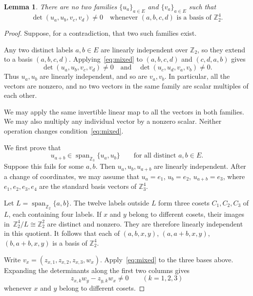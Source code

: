 \documentclass[10pt,a4paper]{amsart}
\theoremstyle{plain}
\newtheorem{lemma}[theorem]{Lemma}
\numberwithin{equation}{section}
\theoremstyle{remark}
\theoremstyle{definition}
\newcommand{\Z}{\mathbb Z}
\newcommand{\spn}[2]{\operatorname{span}_{\Z_#1}\{#2\}}
\newcommand{\wideand}{\quad \text{and} \quad}
\begin{document}
\begin{lemma}\label{lem:mixed}
    There are no two families $\{u_a\}_{a\in E}$ and $\{v_a\}_{a\in E}$ such that
    \begin{equation}\label{eq:mixed}
        \det(u_a,u_b,v_c,v_d)\ne0 \quad\text{whenever }(a,b,c,d)\text{ is a basis of }\Z_2^4.
    \end{equation}
\end{lemma}
\begin{proof}
Suppose, for a contradiction, that two such families exist.

Any two distinct labels $a,b\in E$ are linearly independent over $\Z_2$, so they extend to a basis $(a,b,c,d)$.
Applying~\eqref{eq:mixed} to $(a,b,c,d)$ and $(c,d,a,b)$ gives
$$
    \det(u_a,u_b,v_c,v_d)\ne0 \wideand \det(u_c,u_d,v_a,v_b)\ne0.
$$
Thus $u_a,u_b$ are linearly independent, and so are $v_a,v_b$.
In particular, all the vectors are nonzero, and no two vectors in the same family are scalar multiples of each other.

We may apply the same invertible linear map to all the vectors in both families.
We may also multiply any individual vector by a nonzero scalar.
Neither operation changes condition~\eqref{eq:mixed}.

We first prove that
\begin{equation}\label{eq:mixed-span}
    u_{a+b}\in \spn{3}{u_a,u_b} \qquad\text{for all distinct }a,b\in E.
\end{equation}
Suppose this fails for some $a,b$.
Then $u_a,u_b,u_{a+b}$ are linearly independent.
After a change of coordinates, we may assume that $u_a=e_1$, $u_b=e_2$, $u_{a+b}=e_3$, where $e_1,e_2,e_3,e_4$ are the standard basis vectors of $\Z_3^4$.

Let $L=\spn{2}{a,b}$.
The twelve labels outside $L$ form three cosets $C_1,C_2,C_3$ of $L$, each containing four labels.
If $x$ and $y$ belong to different cosets, their images in~$\Z_2^4/L\cong\Z_2^2$ are distinct and nonzero.
They are therefore linearly independent in this quotient.
It follows that each of $(a,b,x,y)$, $(a,a+b,x,y)$, $(b,a+b,x,y)$ is a basis of $\Z_2^4$.

Write $v_x=(z_{x,1},z_{x,2},z_{x,3},w_x)$.
Apply~\eqref{eq:mixed} to the three bases above.
Expanding the determinants along the first two columns gives
\begin{equation}\label{eq:ratios}
    z_{x,k}w_y-z_{y,k}w_x\ne0  \qquad(k=1,2,3)
\end{equation}
whenever $x$ and $y$ belong to different cosets.


\end{proof}
\end{document}
